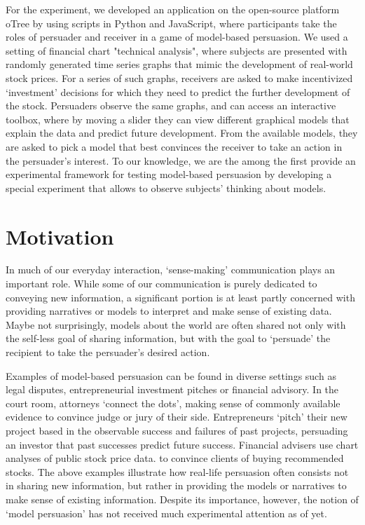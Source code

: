 \documentclass[11pt, a4paper, leqno]{article}
\begin{document}
For the experiment, we developed an application on the open-source platform oTree by \cite{chen2016otree} using scripts in Python and JavaScript, where participants take the roles of persuader and receiver in a game of model-based persuasion. We used a setting of financial chart "technical analysis", where subjects are presented with randomly generated time series graphs that mimic the development of real-world stock prices. For a series of such graphs, receivers are asked to make incentivized `investment' decisions for which they need to predict the further development of the stock. Persuaders observe the same graphs, and can access an interactive toolbox, where by moving a slider they can view different graphical models that explain the data and predict future development. From the available models, they are asked to pick a model that best convinces the receiver to take an action in the persuader's interest. To our knowledge, we are the among the first provide an experimental framework for testing model-based persuasion by developing a special experiment that allows to observe subjects' thinking about models.


\section{Motivation}

In much of our everyday interaction, `sense-making' communication plays an important role. While some of our communication is purely dedicated to conveying new information, a significant portion is at least partly concerned with providing narratives or models to interpret and make sense of existing data. Maybe not surprisingly, models about the world are often shared not only with the self-less goal of sharing information, but with the goal to `persuade' the recipient to take the persuader's desired action.

Examples of model-based persuasion can be found in diverse settings such as legal disputes, entrepreneurial investment pitches or financial advisory. In the court room, attorneys  `connect the dots', making sense of commonly available evidence to convince judge or jury of their side. Entrepreneurs `pitch' their new project based in the observable success and failures of past projects, persuading an investor that past successes predict future success. Financial advisers use chart analyses of public stock price data. to convince clients of buying recommended stocks. The above examples illustrate how real-life persuasion often consists not in sharing new information, but rather in providing the models or narratives to make sense of existing information. Despite its importance, however, the notion of `model persuasion' has not received much experimental attention as of yet. 
\end{document}

